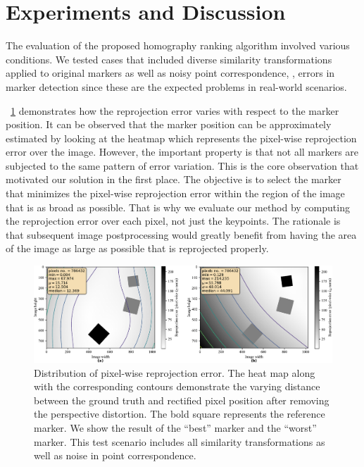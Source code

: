 \section{Experiments and Discussion}
\label{sec:HomographyExperiments}

The evaluation of the proposed homography ranking algorithm involved various conditions. We tested cases that included diverse similarity transformations applied to original markers as well as noisy point correspondence, \egtext{}, errors in marker detection since these are the expected problems in real-world scenarios.

\figtext{}~\ref{fig:HeatmapsBestWorst} demonstrates how the reprojection error varies with respect to the marker position. It can be observed that the marker position can be approximately estimated by looking at the heatmap which represents the pixel-wise reprojection error over the image. However, the important property is that not all markers are subjected to the same pattern of error variation. This is the core observation that motivated our solution in the first place. The objective is to select the marker that minimizes the pixel-wise reprojection error within the region of the image that is as broad as possible. That is why we evaluate our method by computing the reprojection error over each pixel, not just the keypoints. The rationale is that subsequent image postprocessing would greatly benefit from having the area of the image as large as possible that is reprojected properly.

\begin{figure}[t]
    \centerline{\includegraphics[width=\linewidth]{figures/homography/heatmaps_best_worst.pdf}}
    \caption[Homography ranking heatmaps]{Distribution of pixel-wise reprojection error. The heat map along with the corresponding contours demonstrate the varying distance between the ground truth and rectified pixel position after removing the perspective distortion. The bold square represents the reference marker. We show the result of  the ``best'' marker and  the ``worst'' marker. This test scenario includes all similarity transformations as well as noise in point correspondence.}
    \label{fig:HeatmapsBestWorst}
\end{figure}

